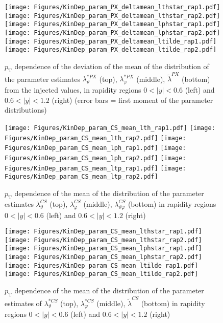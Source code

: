 \documentclass[12pt]{article}
\newcommand{\pT}{p_\mathrm{T}}
\newcommand{\absy}{\left |  y \right |}
\newcommand{\lamthCS}{\lambda^{\scriptscriptstyle CS}_\vartheta}
\newcommand{\lamphCS}{\lambda^{\scriptscriptstyle CS}_\varphi}
\newcommand{\lamthphCS}{\lambda^{\scriptscriptstyle CS}_{\vartheta \varphi}}
\newcommand{\lamtildeCS}{\tilde{\lambda}^{\scriptscriptstyle CS}}
\newcommand{\lamthstarCS}{\lambda^{* \scriptscriptstyle CS}_\vartheta}
\newcommand{\lamphstarCS}{\lambda^{* \scriptscriptstyle CS}_\varphi}
\newcommand{\lamtildePX}{\tilde{\lambda}^{\scriptscriptstyle PX}}
\newcommand{\lamthstarPX}{\lambda^{* \scriptscriptstyle PX}_\vartheta}
\newcommand{\lamphstarPX}{\lambda^{* \scriptscriptstyle PX}_\varphi}
\begin{document}
\begin{figure}[htbp]
\centering
\texttt{[image: Figures/KinDep\_param\_PX\_deltamean\_lthstar\_rap1.pdf]}
\texttt{[image: Figures/KinDep\_param\_PX\_deltamean\_lthstar\_rap2.pdf]}
\texttt{[image: Figures/KinDep\_param\_PX\_deltamean\_lphstar\_rap1.pdf]}
\texttt{[image: Figures/KinDep\_param\_PX\_deltamean\_lphstar\_rap2.pdf]}
\texttt{[image: Figures/KinDep\_param\_PX\_deltamean\_ltilde\_rap1.pdf]}
\texttt{[image: Figures/KinDep\_param\_PX\_deltamean\_ltilde\_rap2.pdf]}
\caption{$\pT$ dependence of the deviation of the mean of the distribution of
the parameter estimates $\lamthstarPX$ (top), $\lamphstarPX$ (middle),
$\lamtildePX$ (bottom) from the injected values, in rapidity regions
$0<\absy<0.6$ (left) and $0.6<\absy<1.2$ (right) (error bars = first moment of
the parameter distributions)}
\end{figure}
\clearpage










\begin{figure}[htbp]
\centering
\texttt{[image: Figures/KinDep\_param\_CS\_mean\_lth\_rap1.pdf]}
\texttt{[image: Figures/KinDep\_param\_CS\_mean\_lth\_rap2.pdf]}
\texttt{[image: Figures/KinDep\_param\_CS\_mean\_lph\_rap1.pdf]}
\texttt{[image: Figures/KinDep\_param\_CS\_mean\_lph\_rap2.pdf]}
\texttt{[image: Figures/KinDep\_param\_CS\_mean\_ltp\_rap1.pdf]}
\texttt{[image: Figures/KinDep\_param\_CS\_mean\_ltp\_rap2.pdf]}
\caption{$\pT$ dependence of the mean of the distribution of the parameter estimates $\lamthCS$ (top), $\lamphCS$ (middle), $\lamthphCS$ (bottom) in rapidity regions $0<\absy<0.6$ (left) and $0.6<\absy<1.2$ (right)}
\end{figure}
\clearpage

\begin{figure}[htbp]
\centering
\texttt{[image: Figures/KinDep\_param\_CS\_mean\_lthstar\_rap1.pdf]}
\texttt{[image: Figures/KinDep\_param\_CS\_mean\_lthstar\_rap2.pdf]}
\texttt{[image: Figures/KinDep\_param\_CS\_mean\_lphstar\_rap1.pdf]}
\texttt{[image: Figures/KinDep\_param\_CS\_mean\_lphstar\_rap2.pdf]}
\texttt{[image: Figures/KinDep\_param\_CS\_mean\_ltilde\_rap1.pdf]}
\texttt{[image: Figures/KinDep\_param\_CS\_mean\_ltilde\_rap2.pdf]}
\caption{$\pT$ dependence of the mean of the distribution of the parameter estimates of $\lamthstarCS$ (top), $\lamphstarCS$ (middle), $\lamtildeCS$ (bottom) in rapidity regions $0<\absy<0.6$ (left) and $0.6<\absy<1.2$ (right)}
\end{figure}
\clearpage
\end{document}
